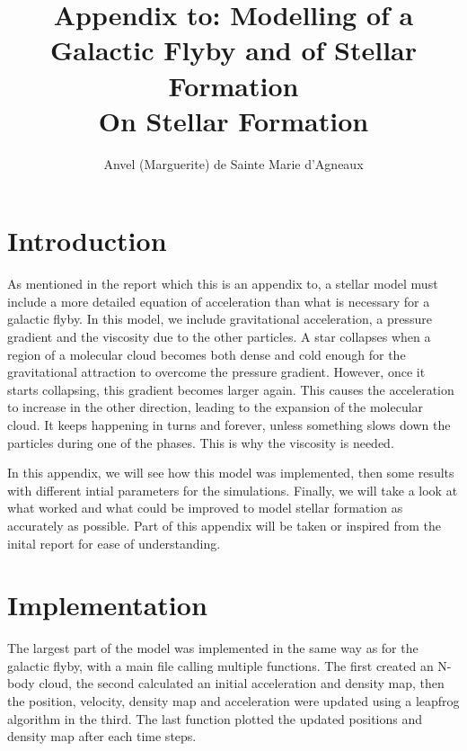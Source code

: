 \documentclass[a4paper,12pt]{article}
\title{Appendix to: Modelling of a Galactic Flyby and of Stellar Formation\\ 
\large On Stellar Formation}
\author{Anvel (Marguerite) de Sainte Marie d'Agneaux}
\date{}
\begin{document}
\maketitle



\section{Introduction}
\label{sec:intro}
As mentioned in the report which this is an appendix to, a stellar model must include a more detailed equation of acceleration than what is necessary for a galactic flyby. In this model, we include gravitational acceleration, a pressure gradient and the viscosity due to the other particles. A star collapses when a region of a molecular cloud becomes both dense and cold enough for the gravitational attraction to overcome the pressure gradient. However, once it starts collapsing, this gradient becomes larger again. This causes the acceleration to increase in the other direction, leading to the expansion of the molecular cloud. It keeps happening in turns and forever, unless something slows down the particles during one of the phases. This is why the viscosity is needed.

In this appendix, we will see how this model was implemented, then some results with different intial parameters for the simulations. Finally, we will take a look at what worked and what could be improved to model stellar formation as accurately as possible. Part of this appendix will be taken or inspired from the inital report for ease of understanding.

\section{Implementation}
\label{sec:imp}
The largest part of the model was implemented in the same way as for the galactic flyby, with a main file calling multiple functions. The first created an N-body cloud, the second calculated an initial acceleration and density map, then the position, velocity, density map and acceleration were updated using a leapfrog algorithm in the third. The last function plotted the updated positions and density map after each time steps. 
\end{document}
